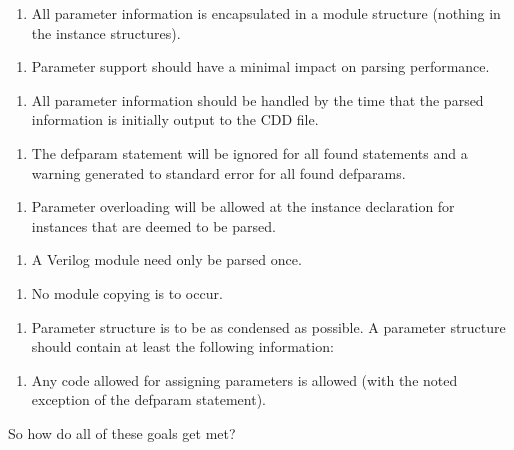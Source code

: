 \begin{enumerate}
\item 
All parameter information is encapsulated in a module structure (nothing in the instance structures).\end{enumerate}
\begin{enumerate}
\item 
Parameter support should have a minimal impact on parsing performance.\end{enumerate}
\begin{enumerate}
\item 
All parameter information should be handled by the time that the parsed information is initially output to the CDD file.\end{enumerate}
\begin{enumerate}
\item 
The defparam statement will be ignored for all found statements and a warning generated to standard error for all found defparams.\end{enumerate}
\begin{enumerate}
\item 
Parameter overloading will be allowed at the instance declaration for instances that are deemed to be parsed.\end{enumerate}
\begin{enumerate}
\item 
A Verilog module need only be parsed once.\end{enumerate}
\begin{enumerate}
\item 
No module copying is to occur.\end{enumerate}
\begin{enumerate}
\item 
Parameter structure is to be as condensed as possible. A parameter structure should contain at least the following information:
\end{enumerate}
\begin{enumerate}
\item 
Any code allowed for assigning parameters is allowed (with the noted exception of the defparam statement).\end{enumerate}
So how do all of these goals get met?

